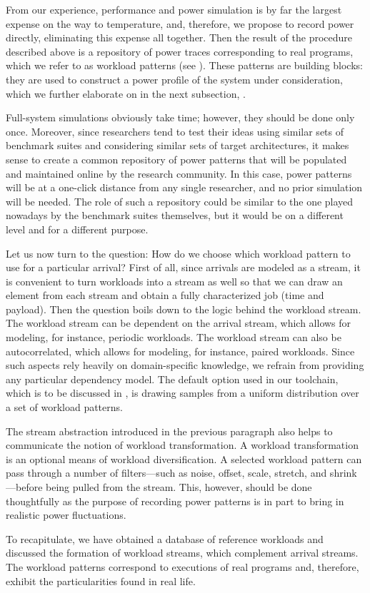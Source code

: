 From our experience, performance and power simulation is by far the largest
expense on the way to temperature, and, therefore, we propose to record power
directly, eliminating this expense all together. Then the result of the
procedure described above is a repository of power traces corresponding to real
programs, which we refer to as workload patterns (see ). These
patterns are building blocks: they are used to construct a power profile of the
system under consideration, which we further elaborate on in the next
subsection, .

Full-system simulations obviously take time; however, they should be done only
once. Moreover, since researchers tend to test their ideas using similar sets of
benchmark suites and considering similar sets of target architectures, it makes
sense to create a common repository of power patterns that will be populated and
maintained online by the research community. In this case, power patterns will
be at a one-click distance from any single researcher, and no prior simulation
will be needed. The role of such a repository could be similar to the one played
nowadays by the benchmark suites themselves, but it would be on a different
level and for a different purpose.

Let us now turn to the question: How do we choose which workload pattern to use
for a particular arrival? First of all, since arrivals are modeled as a stream,
it is convenient to turn workloads into a stream as well so that we can draw an
element from each stream and obtain a fully characterized job (time and
payload). Then the question boils down to the logic behind the workload stream.
The workload stream can be dependent on the arrival stream, which allows for
modeling, for instance, periodic workloads. The workload stream can also be
autocorrelated, which allows for modeling, for instance, paired workloads. Since
such aspects rely heavily on domain-specific knowledge, we refrain from
providing any particular dependency model. The default option used in our
toolchain, which is to be discussed in , is drawing samples from
a uniform distribution over a set of workload patterns.

The stream abstraction introduced in the previous paragraph also helps to
communicate the notion of workload transformation. A workload transformation is
an optional means of workload diversification. A selected workload pattern can
pass through a number of filters---such as noise, offset, scale, stretch, and
shrink---before being pulled from the stream. This, however, should be done
thoughtfully as the purpose of recording power patterns is in part to bring in
realistic power fluctuations.

To recapitulate, we have obtained a database of reference workloads and
discussed the formation of workload streams, which complement arrival streams.
The workload patterns correspond to executions of real programs and, therefore,
exhibit the particularities found in real life.
